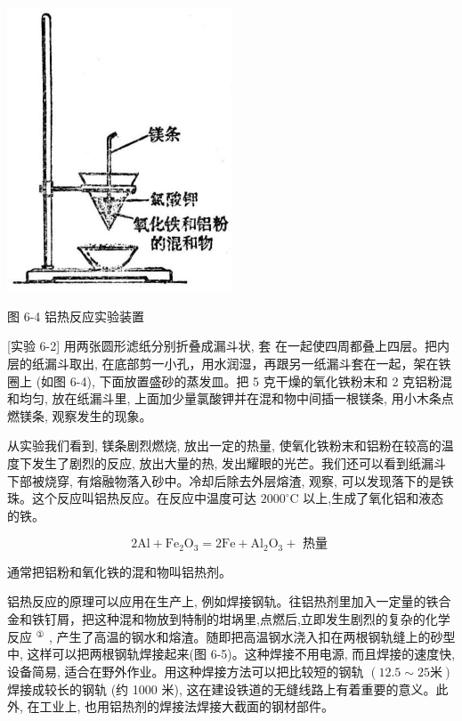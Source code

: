 \documentclass[10pt]{article}
\begin{document}
\begin{center}
\includegraphics[max width=0.5\textwidth]{images/01912d13-9986-7822-a012-3f3f7be99dcb_188_726669.jpg}
\end{center}

图 6-4 铝热反应实验装置

[实验 6-2] 用两张圆形滤纸分别折叠成漏斗状, 套 在一起使四周都叠上四层。把内层的纸漏斗取出, 在底部剪一小孔，用水润湿，再跟另一纸漏斗套在一起，架在铁圈上 (如图 6-4), 下面放置盛砂的蒸发皿。把 5 克干燥的氧化铁粉末和 2 克铝粉混和均匀, 放在纸漏斗里, 上面加少量氯酸钾并在混和物中间插一根镁条, 用小木条点燃镁条, 观察发生的现象。

从实验我们看到, 镁条剧烈燃烧, 放出一定的热量, 使氧化铁粉末和铝粉在较高的温度下发生了剧烈的反应, 放出大量的热, 发出耀眼的光芒。我们还可以看到纸漏斗下部被烧穿, 有熔融物落入砂中。冷却后除去外层熔渣, 观察, 可以发现落下的是铁珠。这个反应叫铝热反应。在反应中温度可达 \({2000}^{ \circ }\mathrm{C}\) 以上,生成了氧化铝和液态的铁。

\[
2\mathrm{{Al}} + {\mathrm{{Fe}}}_{2}{\mathrm{O}}_{3} = 2\mathrm{{Fe}} + {\mathrm{{Al}}}_{2}{\mathrm{O}}_{3} + \text{ 热量 }
\]

通常把铝粉和氧化铁的混和物叫铝热剂。

铝热反应的原理可以应用在生产上, 例如焊接钢轨。往铝热剂里加入一定量的铁合金和铁钉屑，把这种混和物放到特制的坩埚里,点燃后,立即发生剧烈的复杂的化学反应 \({}^{\text{①}}\) , 产生了高温的钢水和熔渣。随即把高温钢水浇入扣在两根钢轨缝上的砂型中, 这样可以把两根钢轨焊接起来(图 6-5)。这种焊接不用电源, 而且焊接的速度快, 设备简易, 适合在野外作业。用这种焊接方法可以把比较短的钢轨 \(\left( {{12.5} \sim {25}\text{米}}\right)\) 焊接成较长的钢轨 (约 1000 米), 这在建设铁道的无缝线路上有着重要的意义。此外, 在工业上, 也用铝热剂的焊接法焊接大截面的钢材部件。
\end{document}
